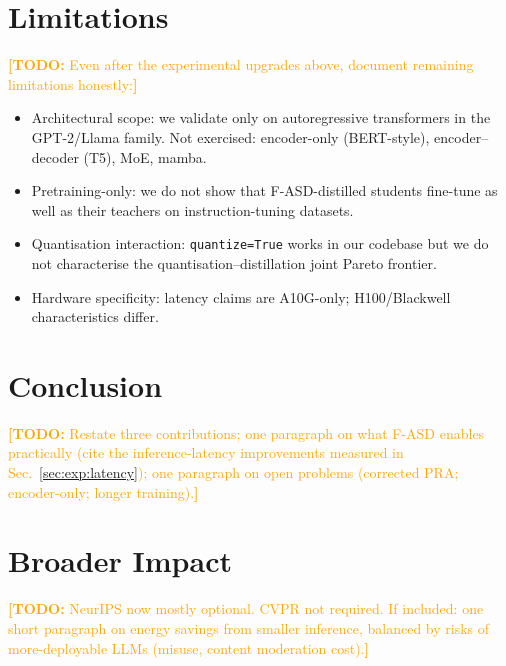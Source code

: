 \documentclass{article}
\newcommand{\todo}[1]{\textcolor{orange}{\textbf{[TODO:} #1\textbf{]}}}
\newcommand{\fasd}{\texorpdfstring{\textsc{F-ASD}}{F-ASD}}
\begin{document}
\section{Limitations}
\label{sec:limits}
\todo{Even after the experimental upgrades above, document remaining
limitations honestly:}
\begin{itemize}[leftmargin=*,nosep]
  \item Architectural scope: we validate only on autoregressive transformers
        in the GPT-2/Llama family. Not exercised: encoder-only (BERT-style),
        encoder--decoder (T5), MoE, mamba.
  \item Pretraining-only: we do not show that \fasd{}-distilled students
        fine-tune as well as their teachers on instruction-tuning datasets.
  \item Quantisation interaction: \texttt{quantize=True} works in our codebase
        but we do not characterise the quantisation--distillation joint
        Pareto frontier.
  \item Hardware specificity: latency claims are A10G-only; H100/Blackwell
        characteristics differ.
\end{itemize}

\section{Conclusion}
\todo{Restate three contributions; one paragraph on what \fasd{} enables
practically (cite the inference-latency improvements measured in
Sec.~\ref{sec:exp:latency}); one paragraph on open problems
(corrected PRA; encoder-only; longer training).}

\section*{Broader Impact}
\todo{NeurIPS now mostly optional. CVPR not required. If included: one
short paragraph on energy savings from smaller inference, balanced by
risks of more-deployable LLMs (misuse, content moderation cost).}
\end{document}
